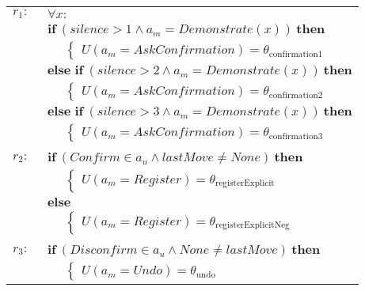 \begin{small}
\begin{longtable}{p{1cm}l} 
$r_{1}: \ \ $ &  $\forall x : $ \\ & $\textbf{if} \ (\mathit{silence}\!>\!\mathit{1} \land \mathit{a_m}\!=\!\mathit{Demonstrate}(x)) \ \textbf{then}$ \\
& $\;\;\;\;\; \begin{cases}U(\mathit{a_m}\!=\!\mathit{AskConfirmation})\!=\!\theta_{\mathrm{confirmation1}}\end{cases}$ \\ 
& $\textbf{else if} \ (\mathit{silence}\!>\!\mathit{2} \land \mathit{a_m}\!=\!\mathit{Demonstrate}(x)) \ \textbf{then}$ \\
& $\;\;\;\;\; \begin{cases}U(\mathit{a_m}\!=\!\mathit{AskConfirmation})\!=\!\theta_{\mathrm{confirmation2}}\end{cases}$ \\ 
& $\textbf{else if} \ (\mathit{silence}\!>\!\mathit{3} \land \mathit{a_m}\!=\!\mathit{Demonstrate}(x)) \ \textbf{then}$ \\
& $\;\;\;\;\; \begin{cases}U(\mathit{a_m}\!=\!\mathit{AskConfirmation})\!=\!\theta_{\mathrm{confirmation3}}\end{cases}$ \\ \\[-2mm]
$r_{2}: \ \ $ & $\textbf{if} \ (\mathit{Confirm}\!\in\!\mathit{a_u} \land \mathit{lastMove}\!\neq\!\mathit{None}) \ \textbf{then}$ \\
& $\;\;\;\;\; \begin{cases}U(\mathit{a_m}\!=\!\mathit{Register})\!=\!\theta_{\mathrm{registerExplicit}}\end{cases}$\\ 
& $\textbf{else}$ \\
& $\;\;\;\;\; \begin{cases}U(\mathit{a_m}\!=\!\mathit{Register})\!=\!\theta_{\mathrm{registerExplicitNeg}}\end{cases}$ \\[3mm]\\[-2mm]
$r_{3}: \ \ $& $\textbf{if} \ (\mathit{Disconfirm}\!\in\!\mathit{a_u} \land \mathit{None}\!\neq\!\mathit{lastMove}) \ \textbf{then}$ \\
& $\;\;\;\;\; \begin{cases}U(\mathit{a_m}\!=\!\mathit{Undo})\!=\!\theta_{\mathrm{undo}}\end{cases}$ \\ 

\end{longtable}
\end{small}
